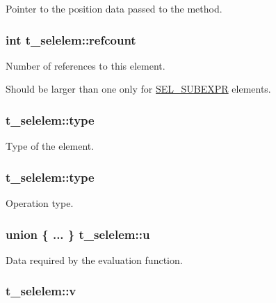 \-Pointer to the position data passed to the method. \hypertarget{structt__selelem_a6082e97ed5fd779a65d0b8d04c12c5bb}{
\subsubsection[{refcount}]{\setlength{\rightskip}{0pt plus 5cm}int {\bf t\-\_\-selelem\-::refcount}}}\label{structt__selelem_a6082e97ed5fd779a65d0b8d04c12c5bb}


\-Number of references to this element. 

\-Should be larger than one only for \hyperlink{selelem_8h_a1f104d5c71b1198ef51acc4ef016ae46a4b01539a457afb7dbdf486c2a2e6dafb}{\-S\-E\-L\-\_\-\-S\-U\-B\-E\-X\-P\-R} elements. \hypertarget{structt__selelem_a092a85a68970855e3ee5ee48e32c809f}{
\subsubsection[{type}]{ {\bf t\-\_\-selelem\-::type}}}\label{structt__selelem_a092a85a68970855e3ee5ee48e32c809f}
\-Type of the element. \hypertarget{structt__selelem_a04adc54787ac557b848ca891ca916f6c}{
\subsubsection[{type}]{ {\bf t\-\_\-selelem\-::type}}}\label{structt__selelem_a04adc54787ac557b848ca891ca916f6c}
\-Operation type. \hypertarget{structt__selelem_a0d2e2459aa975806044860b15bd88187}{
\subsubsection[{u}]{\setlength{\rightskip}{0pt plus 5cm}union \{ ... \}                                     {\bf t\-\_\-selelem\-::u}}}\label{structt__selelem_a0d2e2459aa975806044860b15bd88187}
\-Data required by the evaluation function. \hypertarget{structt__selelem_abbc88b4abc239e042a19414691763ae9}{
\subsubsection[{v}]{ {\bf t\-\_\-selelem\-::v}}}\label{structt__selelem_abbc88b4abc239e042a19414691763ae9}


